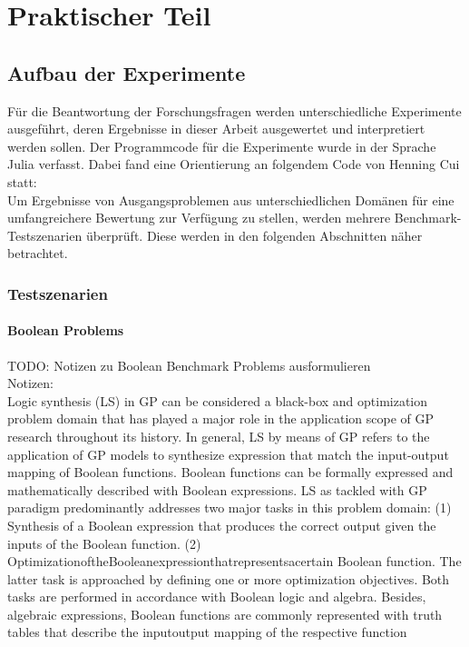 \chapter{Praktischer Teil}
\label{praktischer Teil}

\section{Aufbau der Experimente}
\label{sec:aufbauExperimente}

Für die Beantwortung der Forschungsfragen werden unterschiedliche Experimente ausgeführt, deren Ergebnisse in dieser Arbeit ausgewertet und interpretiert werden sollen.
Der Programmcode für die Experimente wurde in der Sprache Julia verfasst.
Dabei fand eine Orientierung an folgendem Code von Henning Cui statt: \cite{cuihen_cuihencgp_with_crossover_strategies_2024}\\
Um Ergebnisse von Ausgangsproblemen aus unterschiedlichen Domänen für eine umfangreichere Bewertung zur Verfügung zu stellen, werden mehrere Benchmark-Testszenarien überprüft.
Diese werden in den folgenden Abschnitten näher betrachtet.

\subsection{Testszenarien}
\label{subsec:testszenarien}

\subsubsection{Boolean Problems}
\label{subsubsec:booleanProblems}

TODO: Notizen zu Boolean Benchmark Problems ausformulieren\\
Notizen:
\cite{kalkreuth_towards_2023}\\
Logic synthesis (LS) in GP can be considered a black-box and optimization problem domain that has played a major role in the application scope of GP research throughout its history. In general, LS by means of GP refers to the application of GP models to synthesize expression that match the input-output mapping of Boolean functions. Boolean functions can be formally expressed and mathematically described with Boolean expressions. LS as tackled with GP paradigm predominantly addresses two major tasks in this problem domain: (1) Synthesis of a Boolean expression that produces the correct output given the inputs of the Boolean function. (2) OptimizationoftheBooleanexpressionthatrepresentsacertain Boolean function. The latter task is approached by defining one or more optimization objectives. Both tasks are performed in accordance with Boolean logic and algebra. Besides, algebraic expressions, Boolean functions are commonly represented with truth tables that describe the inputoutput mapping of the respective function


